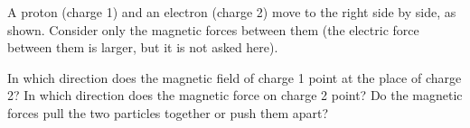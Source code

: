 A proton (charge 1) and an electron (charge 2) move to the right side by side, as shown. Consider only the magnetic forces between them (the electric force between them is larger, but it is not asked here).

\begin{center}
\end{center}

\begin{abcliste}
\abc In which direction does the magnetic field of charge 1 point at the place of charge 2?
\abc In which direction does the magnetic force on charge 2 point?
\abc Do the magnetic forces pull the two particles together or push them apart?
\end{abcliste}
